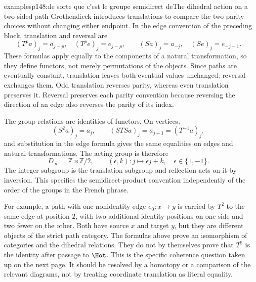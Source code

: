 \begin{dcomment}{examples}{p148:de sorte que c'est le groupe semidirect de}{The dihedral action on a two-sided path}
Grothendieck introduces translations to compare the two parity choices without changing either endpoint. In the edge convention of the preceding block, translation and reversal are
\[
 (T^pa)_j=a_{j-p},\quad (T^pe)_j=e_{j-p},
 \qquad
 (Sa)_j=a_{-j},\quad (Se)_j=e_{-j-1}.
\]
These formulas apply equally to the components of a natural transformation, so they define functors, not merely permutations of the objects. Since paths are eventually constant, translation leaves both eventual values unchanged; reversal exchanges them. Odd translation reverses parity, whereas even translation preserves it. Reversal preserves each parity convention because reversing the direction of an edge also reverses the parity of its index.

The group relations are identities of functors. On vertices,
\[
 (S^2a)_j=a_j,
 \qquad
 (STSa)_j=a_{j+1}=(T^{-1}a)_j,
\]
and substitution in the edge formula gives the same equalities on edges and natural transformations. The acting group is therefore
\[
 D_\infty=\mathbb Z\rtimes\mathbb Z/2,
 \qquad (\epsilon,k):j\longmapsto\epsilon j+k,
 \quad \epsilon\in\{1,-1\}.
\]
The integer subgroup is the translation subgroup and reflection acts on it by inversion. This specifies the semidirect-product convention independently of the order of the groups in the French phrase.

For example, a path with one nonidentity edge $e_0:x\to y$ is carried by $T^2$ to the same edge at position $2$, with two additional identity positions on one side and two fewer on the other. Both have source $x$ and target $y$, but they are different objects of the strict path category. The formulas above prove an isomorphism of categories and the dihedral relations. They do not by themselves prove that $T^2$ is the identity after passage to $\Hot$. This is the specific coherence question taken up on the next page. It should be resolved by a homotopy or a comparison of the relevant diagrams, not by treating coordinate translation as literal equality.
\end{dcomment}


